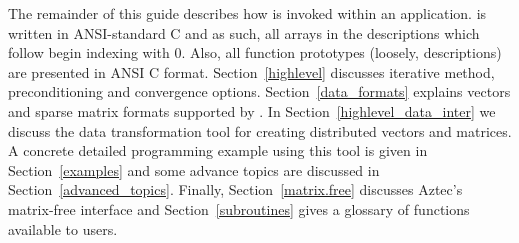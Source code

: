 The remainder of this guide describes how \Az{} is invoked within an
application.  \Az{} is written in ANSI-standard C and as such, all arrays in
the descriptions which follow begin indexing with 0.  Also, all function
prototypes (loosely, descriptions) are presented in ANSI C format.
Section~\ref{highlevel} discusses iterative method, preconditioning and
convergence options.  Section~\ref{data_formats} explains vectors and sparse
matrix formats supported by \Az{}.  In Section~\ref{highlevel_data_inter} we
discuss the data transformation tool for creating distributed vectors and
matrices. A concrete detailed programming example using this tool is given in
Section~\ref{examples} and some advance topics are discussed in
Section~\ref{advanced_topics}.  
Finally, 
Section~\ref{matrix.free} discusses Aztec's matrix-free interface and
Section~\ref{subroutines} gives a
glossary of \Az{} functions available to users.


